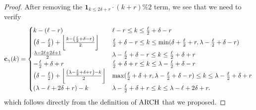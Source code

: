 \begin{proof}
After removing the $\mathbf{1}_{k \le 2 \delta + r} \cdot (k + r) \% 2$ term,
we see that we need to verify
\[
  \mathbf c_\gamma(k)
  =
  \begin{cases}
    k - (\ell-r) & \ell - r \le k \le \frac{\ell}{2} + \delta - r \\
    \left( \delta - \frac{\ell}{2}  \right)
      + \left\lfloor \frac{k - \left( \frac{\ell}{2} + \delta - r \right)}{2}  \right\rfloor
      & \frac{\ell}{2} + \delta - r \le k \le \min(\delta + \frac{\ell}{2} + r,
      \lambda - \frac{\ell}{2} + \delta - r) \\
    \frac{\lambda-2\ell+2\delta+1}{2}
      & \lambda - \frac{\ell}{2} + \delta - r \le k \le \frac{\ell}{2} + \delta + r \\
    -\frac{\ell}{2} + \delta + r
      & \frac{\ell}{2} + \delta + r \le k \le \lambda - \frac{\ell}{2} + \delta - r \\
    \left( \delta - \frac{\ell}{2} \right)
      + \left\lfloor \frac{\left( \lambda - \frac{\ell}{2} + \delta + r \right) - k}{2} \right\rfloor
      & \max(\frac{\ell}{2} + \delta + r, \lambda - \frac{\ell}{2} + \delta - r)
      \le k \le \lambda - \frac{\ell}{2} + \delta + r \\
    (\lambda - \ell + 2 \delta + r) - k
      & \lambda - \frac{\ell}{2} + \delta + r \le k \le \lambda - \ell + 2 \delta + r.
  \end{cases}
\]
which follows directly from the definition of $\operatorname*{ARCH}$ that we proposed.
\end{proof}

